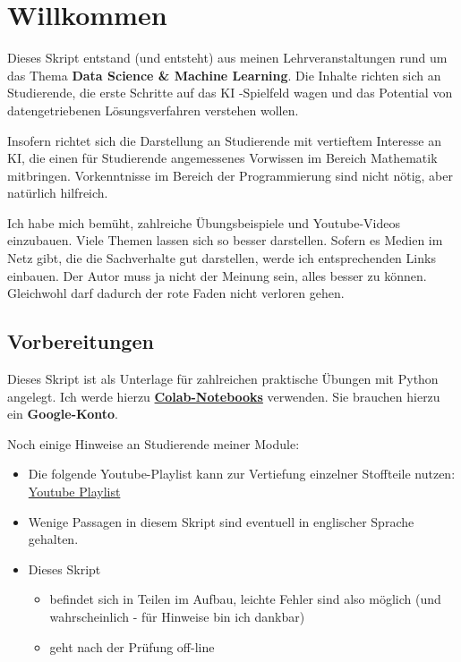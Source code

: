 \documentclass[
  oneside]{book}
\providecommand{\tightlist}{%
  \setlength{\itemsep}{0pt}\setlength{\parskip}{0pt}}
\begin{document}
{
\setcounter{tocdepth}{1}
\tableofcontents
}
\hypertarget{willkommen}{%
\chapter*{Willkommen}\label{willkommen}}

Dieses Skript entstand (und entsteht) aus meinen Lehrveranstaltungen rund um das Thema \textbf{Data Science \& Machine Learning}. Die Inhalte richten sich an Studierende, die erste Schritte auf das KI -Spielfeld wagen und das Potential von datengetriebenen Lösungsverfahren verstehen wollen.

Insofern richtet sich die Darstellung an Studierende mit vertieftem Interesse an KI, die einen für Studierende angemessenes Vorwissen im Bereich Mathematik mitbringen. Vorkenntnisse im Bereich der Programmierung sind nicht nötig, aber natürlich hilfreich.

Ich habe mich bemüht, zahlreiche Übungsbeispiele und Youtube-Videos einzubauen. Viele Themen lassen sich so besser darstellen. Sofern es Medien im Netz gibt, die die Sachverhalte gut darstellen, werde ich entsprechenden Links einbauen. Der Autor muss ja nicht der Meinung sein, alles besser zu können. Gleichwohl darf dadurch der rote Faden nicht verloren gehen.

\hypertarget{vorbereitungen}{%
\section*{Vorbereitungen}\label{vorbereitungen}}

Dieses Skript ist als Unterlage für zahlreichen praktische Übungen mit Python angelegt. Ich werde hierzu \href{https://colab.research.google.com/}{\textbf{Colab-Notebooks}} verwenden. Sie brauchen hierzu ein \textbf{Google-Konto}.

Noch einige Hinweise an Studierende meiner Module:

\begin{itemize}
\tightlist
\item
  Die folgende Youtube-Playlist kann zur Vertiefung einzelner Stoffteile nutzen: \href{https://youtube.com/playlist?list=PLfGN40VwjduJPvtP9QUjC0rjM6-ePT9bg}{Youtube Playlist}
\item
  Wenige Passagen in diesem Skript sind eventuell in englischer Sprache gehalten.
\item
  Dieses Skript

  \begin{itemize}
  \tightlist
  \item
    befindet sich in Teilen im Aufbau, leichte Fehler sind also möglich (und wahrscheinlich - für Hinweise bin ich dankbar)
  \item
    geht nach der Prüfung off-line
  \end{itemize}
\end{itemize}
\end{document}
